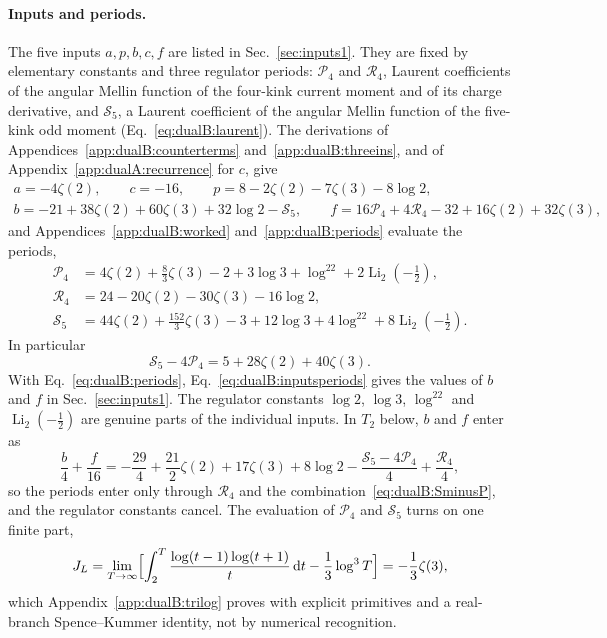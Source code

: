 \documentclass[11pt,a4paper]{article}
\numberwithin{equation}{section}
\newcommand{\dd}{\,\mathrm d}
\newcommand{\Li}{\operatorname{Li}}
\begin{document}
\paragraph{Inputs and periods.} The five inputs $a,p,b,c,f$ are listed in Sec.~\ref{sec:inputs1}. They are fixed by
elementary constants and three regulator periods: $\mathcal P_4$ and $\mathcal R_4$, Laurent coefficients of the
angular Mellin function of the four-kink current moment and of its charge derivative, and $\mathcal S_5$, a Laurent
coefficient of the angular Mellin function of the five-kink odd moment (Eq.~\eqref{eq:dualB:laurent}). The
derivations of Appendices~\ref{app:dualB:counterterms} and~\ref{app:dualB:threeins}, and of
Appendix~\ref{app:dualA:recurrence} for $c$, give
\begin{equation}
\begin{gathered}
 a=-4\zeta(2),\qquad c=-16,\qquad p=8-2\zeta(2)-7\zeta(3)-8\log2,\\
 b=-21+38\zeta(2)+60\zeta(3)+32\log2-\mathcal S_5,\qquad
 f=16\mathcal P_4+4\mathcal R_4-32+16\zeta(2)+32\zeta(3),
\end{gathered}
\label{eq:dualB:inputsperiods}
\end{equation}
and Appendices~\ref{app:dualB:worked} and~\ref{app:dualB:periods} evaluate the periods,
\begin{equation}
\begin{aligned}
 \mathcal P_4&=4\zeta(2)+\tfrac83\zeta(3)-2+3\log3+\log^22+2\Li_2(-\tfrac12),\\
 \mathcal R_4&=24-20\zeta(2)-30\zeta(3)-16\log2,\\
 \mathcal S_5&=44\zeta(2)+\tfrac{152}{3}\zeta(3)-3+12\log3+4\log^22+8\Li_2(-\tfrac12).
\end{aligned}
\label{eq:dualB:periods}
\end{equation}
In particular
\begin{equation}
 \mathcal S_5-4\mathcal P_4=5+28\zeta(2)+40\zeta(3).
 \label{eq:dualB:SminusP}
\end{equation}
With Eq.~\eqref{eq:dualB:periods}, Eq.~\eqref{eq:dualB:inputsperiods} gives the values of $b$ and $f$ in
Sec.~\ref{sec:inputs1}. The regulator constants $\log2$, $\log3$, $\log^22$ and $\Li_2(-\frac12)$ are genuine parts of
the individual inputs. In $T_2$ below, $b$ and $f$ enter as
\begin{equation}
 \frac b4+\frac f{16}=-\frac{29}{4}+\frac{21}{2}\zeta(2)+17\zeta(3)+8\log2
 -\frac{\mathcal S_5-4\mathcal P_4}{4}+\frac{\mathcal R_4}{4},
\end{equation}
so the periods enter only through $\mathcal R_4$ and the combination~\eqref{eq:dualB:SminusP}, and the regulator
constants cancel. The evaluation of $\mathcal P_4$ and $\mathcal S_5$ turns on one finite part,
\begin{equation}
 J_L=\lim_{T\to\infty}\Bigl[\int_2^T\frac{\log(t-1)\log(t+1)}{t}\dd t-\frac13\log^3T\Bigr]=-\frac13\zeta(3),
 \label{eq:dualB:JLshort}
\end{equation}
which Appendix~\ref{app:dualB:trilog} proves with explicit primitives and a real-branch Spence--Kummer identity, not
by numerical recognition.
\end{document}
